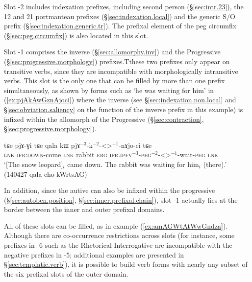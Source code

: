 Slot -2 includes indexation prefixes, including second person  (§\ref{sec:intr.23}), the  1\fl{}2  and  2\fl{}1 portmanteau prefixes (§\ref{sec:indexation.local}) and the generic S/O prefix  (§\ref{sec:indexation.generic.tr}). The prefixal element  of the peg circumfix (§\ref{sec:peg.circumfix}) is also located in this slot.

Slot -1 comprises the inverse  (§\ref{sec:allomorphy.inv}) and the Progressive  (§\ref{sec:progressive.morphology}) prefixes.Tthese two prefixes only appear on transitive verbs, since they are incompatible with morphologically intransitive verbs. This slot is the only one that can be filled by more than one prefix simultaneously, as shown by forms such as  `he was waiting for him' in (\ref{ex:pjAkAwGznAjoci}) where the inverse  (see §\ref{sec:indexation.non.local} and §\ref{sec:obviation.saliency} on the function of the inverse prefix in this example) is infixed within the  allomorph of the Progressive (§\ref{sec:contraction}, §\ref{sec:progressive.morphology}).

\begin{exe}
\ex \label{ex:pjAkAwGznAjoci}
\gll   tɕe pjɤ-ɣi tɕe qala kɯ pjɤ$^{-3}$-k$^{-2}$-<>$^{-1}$-nɤjo-ci  tɕe\\
\textsc{lnk} \textsc{ifr}:\textsc{down}-come \textsc{lnk} rabbit \textsc{erg} \textsc{ifr}.\textsc{ipfv}$^{-3}$-\textsc{peg}$^{-2}$-<>$^{-1}$-wait-\textsc{peg} \textsc{lnk}  \\
\glt `[The snow leopard]$_i$ came down.  The rabbit was waiting for him$_i$ (there).' (140427 qala cho kWrtsAG) 	
\end{exe}

In addition, since the autive  can also be infixed within the progressive (§\ref{sec:autoben.position}, §\ref{sec:inner.prefixal.chain}), slot -1 actually lies at the border between the inner and outer prefixal domains.

All of these slots can be filled, as in example (\ref{ex:amAGWtAtWwGndza}). Although there are co-occur\-rence restrictions across slots (for instance, some prefixes in -6 such as the Rhetorical Interrogative  are incompatible with the negative prefixes in -5; additional examples are presented in §\ref{sec:templatic.verb}), it is possible to build verb forms with nearly any subset of the six prefixal slots of the outer domain.


